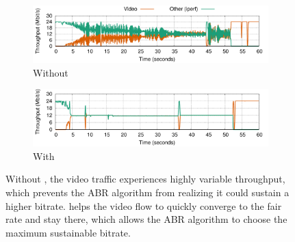 \begin{figure}
    \label{fig:eval:video}
    \centering
    \begin{subfigure}[b]{0.5\textwidth}
        \includegraphics[width=\textwidth]{figure/nobundle-4k-video}
        \caption{Without \name}\label{fig:eval:video:nobundle}
    \end{subfigure}
    \begin{subfigure}[b]{0.5\textwidth}
        \includegraphics[width=\textwidth]{figure/bundle-4k-video}
        \caption{With \name}\label{fig:eval:video:bundle}
    \end{subfigure}
    \caption{Without \name, the video traffic experiences highly variable throughput, which prevents the ABR algorithm from realizing it could sustain a higher bitrate. \name helps the video flow to quickly converge to the fair rate and stay there, which allows the ABR algorithm to choose the maximum sustainable bitrate.}
\end{figure}
